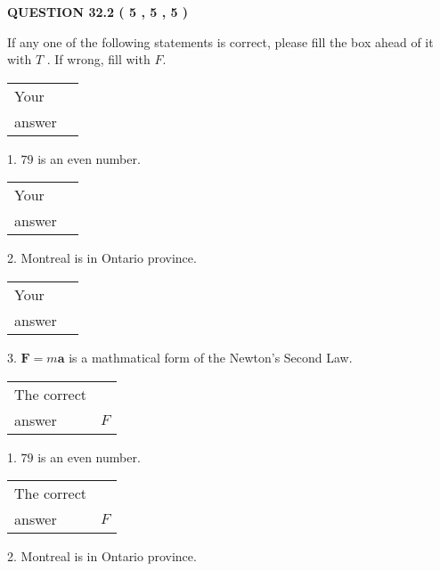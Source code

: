 \documentclass[12pt]{article}
\begin{document}
   
  
\vspace{0.2in}
  
{\textbf{\Large{QUESTION
32.2 
 (           5 ,           5 ,           5 )
}}}
  
  
If any one of the following statements is correct, please fill the box ahead of it with $T$ .
If wrong, fill with $F$.
 
\noindent\begin{tabular}{|l|l|}\hline Your&\hspace{.2in} \\ answer&\hspace{.2in} \\ \hline \end{tabular}
1. $ %
79$ is an  %
even number.
 
\noindent\begin{tabular}{|l|l|}\hline Your&\hspace{.2in} \\ answer&\hspace{.2in} \\ \hline \end{tabular}
2.  %
Montreal is in  %
Ontario province.
 
\noindent\begin{tabular}{|l|l|}\hline Your&\hspace{.2in} \\ answer&\hspace{.2in} \\ \hline \end{tabular}
3.  %
$\mathbf{F}=m\mathbf{a}$ is a mathmatical form of
the Newton's Second Law.
 
 
 
\noindent{}
 
 

 
\noindent\begin{tabular}{|l|l|}\hline The correct & \\
          answer &  %
$F$ \\ \hline \end{tabular}
1. $ %
79$ is an  %
even number.
 
\noindent\begin{tabular}{|l|l|}\hline The correct & \\
          answer &  %
$F$ \\ \hline \end{tabular}
2.  %
Montreal is in  %
Ontario province.
 
\end{document}
